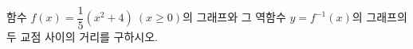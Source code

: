 \hspace*{2mm}\begin{minipage}[t]{\dimexpr\linewidth-2mm\relax}\vspace{0pt}
함수 $f(x)=\dfrac{1}{5}(x^2+4)\ (x\ge 0)$의 그래프와 그 역함수 $y=f^{-1}(x)$의 그래프의 두 교점 사이의 거리를 구하시오.\end{minipage}
